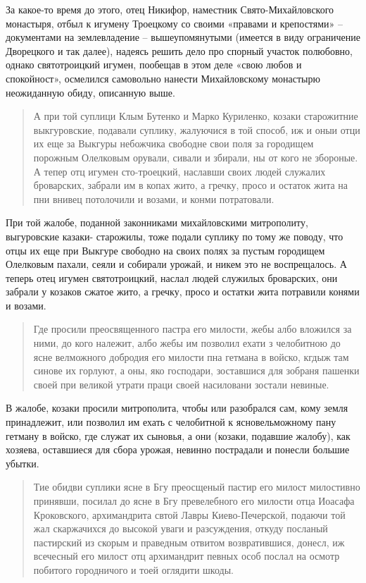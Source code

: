 За какое-то время до этого, отец Никифор, наместник Свято-Михайловского монастыря, отбыл к игумену Троецкому со своими «правами и крепостями» – документами на землевладение – вышеупомянутыми (имеется в виду ограничение Дворецкого и так далее), надеясь решить дело про спорный участок полюбовно, однако святотроицкий игумен, пообещав в этом деле «свою любов и спокойност», осмелился самовольно нанести Михайловскому монастырю неожиданную обиду, описанную выше.

\begin{quotation}
А при той суплици Клым Бутенко и Марко
Куриленко, козаки старожитние выкгуровские, подавали суплику, жалуючися в той способ, иж и оныи отци их еще за Выкгуры небожчика свободне свои поля за городищем порожным Олелковым орували, сивали и збирали, ны от кого не збороные. А тепер отц игумен сто-троецкий, наславши своих людей служалих броварских, забрали им в копах жито, а гречку, просо и остаток жита на пни внивец потолочили и возами, и конми потратовали. 
\end{quotation}

При той жалобе, поданной законниками михайловскими митрополиту, выгуровские казаки- старожилы, тоже подали суплику по тому же поводу, что отцы их еще при Выкгуре свободно на своих полях за пустым городищем Олелковым пахали, сеяли и собирали урожай, и никем это не воспрещалось. А теперь отец игумен святотроицкий, наслал людей служилых броварских, они забрали у козаков сжатое жито, а гречку, просо и остатки жита потравили конями и возами.

\begin{quotation}
Где просили преосвященного пастра его милости, жебы албо вложился за ними, до кого належит, албо жебы им позволил ехати з челобитною до ясне велможного добродия его милости пна гетмана в войско, кгдыж там синове их горлуют, а оны, яко господари, зоставшися для зобраня пашенки своей при великой утрати праци своей насиловани зостали невиные. 
\end{quotation}

В жалобе, козаки просили митрополита, чтобы или разобрался сам, кому земля принадлежит, или позволил им ехать с челобитной к ясновельможному пану гетману в войско, где служат их сыновья, а они (козаки, подавшие жалобу), как хозяева, оставшиеся для сбора урожая, невинно пострадали и понесли большие убытки.

\begin{quotation}
Тие обидви суплики ясне в Бгу преосщеный пастир его милост милостивно принявши, посилал до ясне в Бгу превелебного его милости отца Иоасафа Кроковского, архимандрита свтой Лавры Киево-Печерской, подаючи той жал скаржачихся до высокой уваги и разсуждения, откуду посланый пастирский из скорым и праведным отвитом возвратившися, донесл, иж всечесный его милост отц архимандрит певных особ послал на осмотр побитого городничого и тоей оглядити шкоды. 
\end{quotation}

